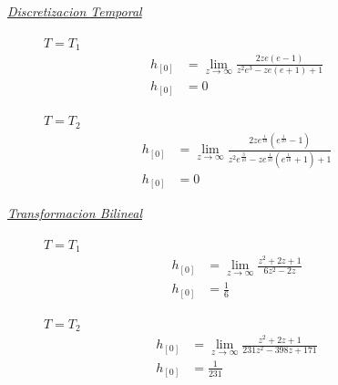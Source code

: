 \documentclass[a4paper,12pt]{report}
\begin{document}
\begin{enumerate}[label=\alph*), left=0pt]
                {\centering\underline{\textit{Discretizacion Temporal}}\par}
                \begin{figure}[h!]
                    \centering
                    \begin{minipage}{0.4\textwidth}
                        \centering
                        $T = T_1$
                        \begin{align*}
                            h_{[0]} &= \lim_{z \to \infty} \frac{2 z e (e - 1)}{z^2 e^3 - z e (e + 1) + 1}\\
                            h_{[0]} &= 0
                        \end{align*}
                    \end{minipage}
                    \hspace{0.5cm}
                    \begin{minipage}{0.4\textwidth}
                        \centering
                        $T = T_2$
                        \begin{align*}
                            h_{[0]} &= \lim_{z \to \infty} \frac{2 z e^{\frac{1}{10}} (e^{\frac{1}{10}} - 1)}
                                {z^2 e^{\frac{3}{10}} - z  e^{\frac{1}{10}}(e^{\frac{1}{10}} + 1) + 1}\\
                            h_{[0]} &= 0
                        \end{align*}
                    \end{minipage}
                \end{figure}

                {\centering\underline{\textit{Transformacion Bilineal}}\par}
                \begin{figure}[h!]
                    \centering
                    \begin{minipage}{0.4\textwidth}
                        \centering
                        $T = T_1$
                        \begin{align*}
                            h_{[0]} &= \lim_{z \to \infty} \frac{z^2 + 2z + 1}{6z^2 - 2z}\\
                            h_{[0]} &= \frac{1}{6}
                        \end{align*}
                    \end{minipage}
                    \hspace{0.5cm}
                    \begin{minipage}{0.4\textwidth}
                        \centering
                        $T = T_2$
                        \begin{align*}
                            h_{[0]} &= \lim_{z \to \infty} \frac{z^2 + 2z + 1}{231z^2 - 398z + 171}\\
                            h_{[0]} &= \frac{1}{231}
                        \end{align*}
                    \end{minipage}
                \end{figure}


\end{enumerate}
\end{document}
